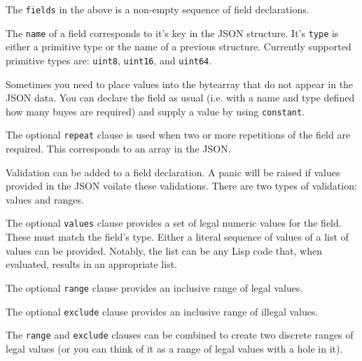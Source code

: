 \documentclass[12pt]{article}
\begin{document}
The \verb|fields| in the above is a non-empty sequence of field
declarations.


The \verb|name| of a field corresponds to it's key in the JSON
structure. It's \verb|type| is either a primitive type or the name of
a previous structure. Currently supported primitive types are:
\verb|uint8|, \verb|uint16|, and \verb|uint64|.


Sometimes you need to place values into the bytearray that do not
appear in the JSON data. You can declare the field as usual (i.e. with
a name and type defined how many buyes are required) and supply a
value by using \verb|constant|.


The optional \verb|repeat| clause is used when two or more repetitions
of the field are required. This corresponds to an array in the JSON.

Validation can be added to a field declaration. A panic will be raised if values provided in the JSON voilate these validations. There are two types of validation: values and ranges.


The optional \verb|values| clause provides a set of legal numeric values
for the field. These must match the field's type. Either a literal
sequence of values of a list of values can be provided. Notably, the
list can be any Lisp code that, when evaluated, results in an
appropriate list.


The optional \verb|range| clause provides an inclusive range of legal
values.


The optional \verb|exclude| clause provides an inclusive range of illegal
values.

The \verb|range| and \verb|exclude| clauses can be combined to create
two discrete ranges of legal values (or you can think of it as a range
of legal values with a hole in it).




\end{document}
